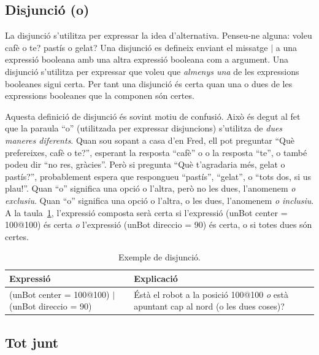 \subsection{Disjunció (o)}
La disjunció s'utilitza per expressar la idea d'alternativa. Penseu-ne alguna: voleu cafè o te? pastís o gelat? Una disjunció es defineix enviant el missatge \textsf{$|$} a una expressió booleana amb una altra expressió booleana com a argument. Una disjunció s'utilitza per expressar que voleu que \emph{almenys una} de les expressions booleanes sigui certa. Per tant una disjunció és certa quan una o dues de les expressions booleanes que la componen són certes.

Aquesta definició de disjunció és sovint motiu de confusió. Això és degut al fet que la paraula ``o'' (utilitzada per expressar disjuncions) s'utilitza de \emph{dues maneres diferents}. Quan sou sopant a casa d'en Fred, ell pot preguntar ``Què prefereixes, cafè o te?'', esperant la resposta ``cafè'' o o la resposta ``te'', o també podeu dir ``no res, gràcies''. Però si pregunta ``Què t'agradaria més, gelat o pastís?'', probablement espera que respongueu ``pastís'', ``gelat'', o ``tots dos, si us plau!''. Quan ``o'' significa una opció o l'altra, però no les dues, l'anomenem \emph{o exclusiu}. Quan ``o'' significa una opció o l'altra, o les dues, l'anomenem \emph{o inclusiu}. A la taula~\ref{tab2004}, l'expressió composta serà certa si l'expressió \textsf{(unBot center = 100@100)} és certa \emph{o} l'expressió \textsf{(unBot direccio = 90)} és certa, o si totes dues són certes.
\begin{table}[h]
\caption{Exemple de disjunció.}
\label{tab2004}
\setlength{\extrarowheight}{1mm}
{\small \begin{tabular}{p{70mm}p{70mm}}
\hline
\textbf{Expressió} & \textbf{Explicació} \\
\hline
\textsf{(unBot center = 100@100) $|$ (unBot direccio = 90)} & Éstà el robot a la posició \textsf{100@100} \emph{o} està apuntant cap al nord (o les dues coses)? \\
\hline
\end{tabular}}
\end{table}

\subsection{Tot junt}

